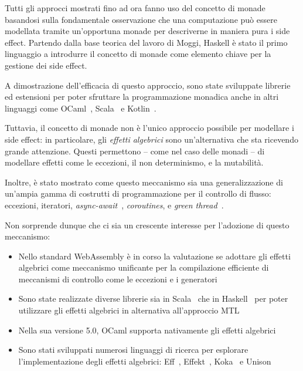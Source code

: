 Tutti gli approcci mostrati fino ad ora fanno uso del concetto di monade basandosi sulla fondamentale osservazione che una computazione può essere modellata tramite un'opportuna monade per descriverne in maniera pura i side effect.
Partendo dalla base teorica del lavoro di Moggi, Haskell è stato il primo linguaggio a introdurre il concetto di monade come elemento chiave per la gestione dei side effect.

A dimostrazione dell'efficacia di questo approccio, sono state sviluppate librerie ed estensioni per poter sfruttare la programmazione monadica anche in altri linguaggi come OCaml~\cite{cit:ppx-let}, Scala~\cite{cit:zio,cit:cats} e Kotlin~\cite{cit:arrow-monad-comprehensions}.

Tuttavia, il concetto di monade non è l'unico approccio possibile per modellare i side effect: in particolare, gli \emph{effetti algebrici} sono un'alternativa che sta ricevendo grande attenzione.
Questi permettono -- come nel caso delle monadi -- di modellare effetti come le eccezioni, il non determinismo, e la mutabilità\cite{cit:handlers-of-algebraic-effects}.

Inoltre, è stato mostrato come questo meccanismo sia una generalizzazione di un'ampia gamma di costrutti di programmazione per il controllo di flusso: eccezioni, iteratori, \emph{async-await}~\cite{cit:structured-asynchrony-with-algebraic-effects}, \emph{coroutines}, e \emph{green thread}~\cite{cit:algebraic-effect-handlers-go-mainstream}.

Non sorprende dunque che ci sia un crescente interesse per l'adozione di questo meccanismo:
\begin{itemize}
  \item Nello standard WebAssembly è in corso la valutazione se adottare gli effetti algebrici come meccanismo unificante per la compilazione efficiente di meccanismi di controllo come le eccezioni e i generatori~\cite{cit:wasmfx}
  \item Sono state realizzate diverse librerie sia in Scala~\cite{cit:scala-effekt} che in Haskell~\cite{cit:fused-effects,cit:effect-handlers,cit:extensible-effects} per poter utilizzare gli effetti algebrici in alternativa all'approccio \ac{MTL}
  \item Nella sua versione 5.0, OCaml supporta nativamente gli effetti algebrici~\cite{cit:retrofitting-effect-handlers-onto-ocaml}
  \item Sono stati sviluppati numerosi linguaggi di ricerca per esplorare l'implementazione degli effetti algebrici: Eff~\cite{cit:eff-lang}, Effekt~\cite{cit:effekt-lang}, Koka~\cite{cit:koka-lang} e Unison~\cite{cit:unison-lang}
\end{itemize}
